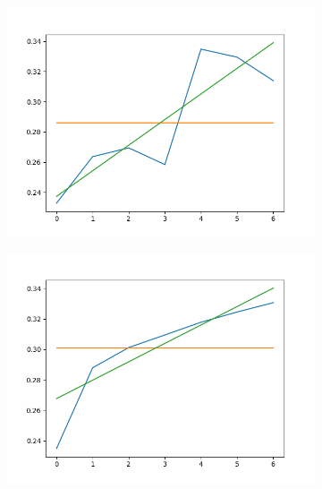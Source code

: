 \documentclass[12pt,a4paper]{scrartcl}
\numberwithin{equation}{section}
\begin{document}
\begin{figure}[h]
	\centering
	\begin{subfigure}{.3\textwidth}
		\centering
		\includegraphics[width=\textwidth]{lr_schedu_Falsch1}
	\end{subfigure}%
	\begin{subfigure}{.3\textwidth}
		\centering
		\includegraphics[width=\textwidth]{lr_schedu_Falsch2}
	\end{subfigure}%
	\begin{subfigure}{.3\textwidth}
		\centering

\end{subfigure}
\end{figure}
\end{document}
